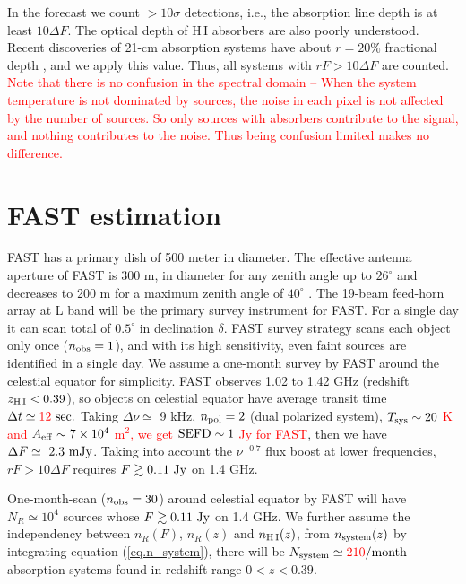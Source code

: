 \documentclass[]{raa}
\newcommand{\HI}{{H{\small\,I}}}
\newcommand{\tcr}{\textcolor{red}}
\begin{document}
In the forecast we count $>10\sigma$ detections, i.e., the absorption
line depth is at least $10\Delta F$. The optical depth of {\HI} absorbers
are also poorly understood. Recent discoveries of 21-cm absorption systems
have about $r=20\%$ fractional depth \citep{2015MNRAS.453.1249A,2015MNRAS.453.1268Z},
and we apply this value. Thus, all systems with $rF>10\Delta F$ are counted.
\tcr{Note that there is no confusion in the spectral domain -- 
When the system temperature is not dominated by sources,
the noise in each pixel is not affected by the number of sources.
So only sources with absorbers contribute to the signal, 
and nothing contributes to the noise.
Thus being confusion limited makes no difference.}



\section{FAST estimation}\label{sec.FAST}

FAST has a primary dish of 500 meter in diameter. The effective
antenna aperture of FAST is 300 m, in diameter for any zenith angle
up to $26^\circ$ and decreases to 200 m for a maximum zenith angle 
of $40^\circ$ \citep{2016RaSc...51.1060L}.
The 19-beam feed-horn array at L band will be the primary survey
instrument for FAST. For a single day it can scan total of $0.5^\circ$
in declination $\delta$. FAST survey strategy scans each object
only once ($n_{\rm obs}=1$), and with its high sensitivity,
even faint sources are identified in a single day. 
We assume a one-month survey by FAST
around the celestial equator for simplicity. FAST observes
1.02 to 1.42 GHz (redshift $z_{\rm \HI}<0.39$), so objects on celestial equator
have average transit time $\Delta t \simeq \tcr{12}\ {\rm sec.}$
Taking $\Delta\nu\simeq$ 9 kHz, $n_{\rm pol}=2$ (dual polarized system),
\tcr{$T_{\rm sys}\sim 20$ K and $A_{\rm eff}\sim 7\times 10^4$ m$^2$,
we get ${\rm SEFD}\sim 1$ Jy for FAST},
then we have $\Delta F \simeq\ 2.3\ {\rm mJy}$.
Taking into account the $\nu^{-0.7}$ flux boost at lower
frequencies, $rF>10\Delta F$ requires $F\gtrsim 0.11\ {\rm Jy}$ on 1.4 GHz.

One-month-scan ($n_{\rm obs}=30$) around celestial equator by FAST will have
$N_R\simeq 10^4$ sources whose $F\gtrsim 0.11\ {\rm Jy}$ on 1.4 GHz.
We further assume the independency between $n_R(F)$, $n_R(z)$
and $n_{\rm\HI}(z)$, from $n_{\rm system}(z)$ by integrating
equation (\ref{eq.n_system}), there will be $N_{\rm system}\simeq \tcr{210} {\rm /month}$ absorption
systems found in redshift range $0<z<0.39$.
\end{document}
